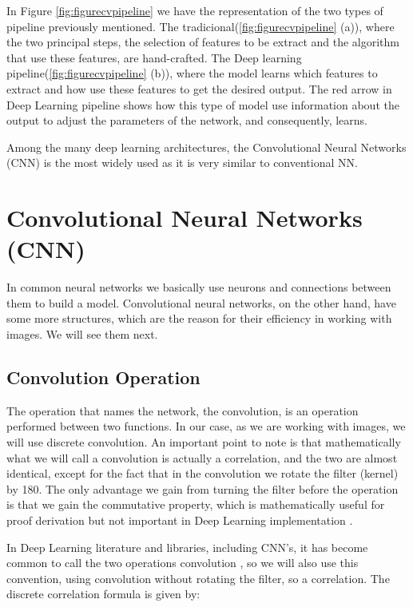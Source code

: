 In Figure \ref{fig:figurecvpipeline} we have the representation of the two types of pipeline previously mentioned. The tradicional(\ref{fig:figurecvpipeline} (a)), where the two principal steps, the selection of features to be extract and the algorithm that use these features, are hand-crafted. The Deep learning pipeline(\ref{fig:figurecvpipeline} (b)), where the model learns which features to extract and how use these features to get the desired output. The red arrow in Deep Learning pipeline shows how this type of model use information about the output to adjust the parameters of the network, and consequently, learns.

Among the many deep learning architectures, the Convolutional Neural Networks (CNN) is the most widely used as it is very similar to conventional NN.

\section{Convolutional Neural Networks (CNN)}

In common neural networks we basically use neurons and connections between them to build a model. Convolutional neural networks, on the other hand, have some more structures, which are the reason for their efficiency in working with images. We will see them next.


\subsection{Convolution Operation}

The operation that names the network, the convolution, is an operation performed between two functions. In our case, as we are working with images, we will use discrete convolution.
An important point to note is that mathematically what we will call a convolution is actually a correlation, and the two are almost identical, except for the fact that in the convolution we rotate the filter (kernel) by 180\textdegree . The only advantage we gain from turning the filter before the operation is that we gain the commutative property, which is mathematically useful for proof derivation but not important in Deep Learning  implementation \cite{goodfellow2016}.

In Deep Learning  literature and libraries, including CNN's, it has become common to call the two operations convolution \cite{goodfellow2016}, so we will also use this convention, using convolution without rotating the filter, so a correlation.
The discrete correlation formula is given by:

